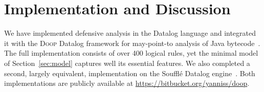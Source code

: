 




\section{Implementation and Discussion}
\label{sec:discussion}

We have implemented defensive analysis in the Datalog language and
integrated it with the \textsc{Doop} Datalog framework for
may-point-to analysis of Java bytecode~\cite{oopsla:2009:Bravenboer}.
The full implementation consists of over 400 logical rules, yet
the minimal model of Section~\ref{sec:model} captures well its
essential features. We also completed a second, largely equivalent,
implementation on the Souffl\'{e} Datalog
engine~\cite{cc:2016:Scholz}. Both implementations are
publicly available at {\small \url{https://bitbucket.org/yanniss/doop}}.

